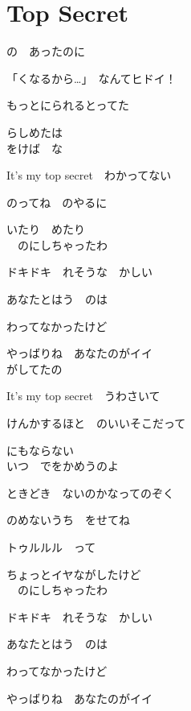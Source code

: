 \section{ Top Secret}
\large{

の　あったのに

「くなるから…」　なんてヒドイ！

もっとにられるとってた

らしめたは
\\

をけば　な

It's my top secret　わかってない

のってね　のやるに

いたり　めたり
\\

　のにしちゃったわ

ドキドキ　れそうな　かしい

あなたとはう　のは

わってなかったけど

やっばりね　あなたのがイイ
\\

がしてたの

It's my top secret　うわさいて

けんかするほと　のいいそこだって

にもならない
\\

いつ　でをかめうのよ

ときどき　ないのかなってのぞく

のめないうち　をせてね

トゥルルル　って

ちょっとイヤながしたけど
\\

　のにしちゃったわ

ドキドキ　れそうな　かしい

あなたとはう　のは

わってなかったけど

やっばりね　あなたのがイイ

}